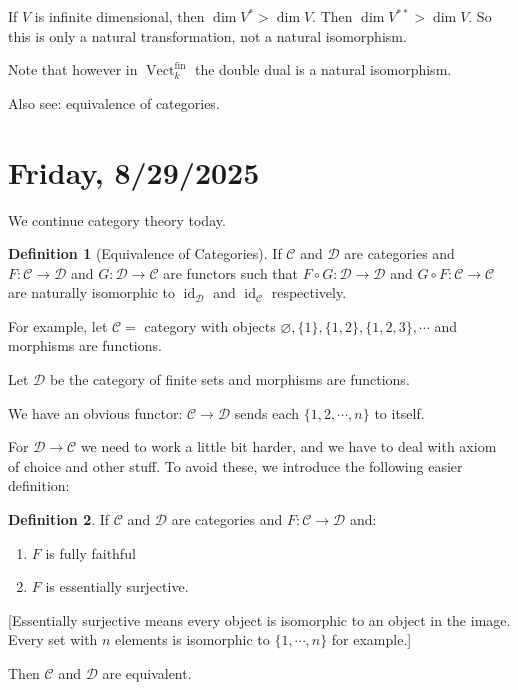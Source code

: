 \documentclass{article}
\theoremstyle{definition}
\newtheorem*{definition}{Definition}
\begin{document}
    If \(V\) is infinite dimensional, then \(\dim V^{\ast} > \dim V\). Then \(\dim V^{\ast\ast} > \dim V\). So this is only a natural transformation, not a natural isomorphism.

    Note that however in \(\operatorname{Vect}_k^{\text{fin}}\) the double dual is a natural isomorphism.

    Also see: equivalence of categories.

    \section*{Friday, 8/29/2025}
    
    We continue category theory today.

    \begin{definition}
        [Equivalence of Categories] If \(\mathcal{C}\) and \(\mathcal{D}\) are categories and \(F: \mathcal{C} \to \mathcal{D}\) and \(G: \mathcal{D} \to \mathcal{C}\) are functors such that \(F \circ G : \mathcal{D} \to \mathcal{D}\) and \(G \circ F: \mathcal{C} \to \mathcal{C}\) are naturally isomorphic to \(\operatorname{id}_{\mathcal{D}} \) and \(\operatorname{id}_{\mathcal{C}} \) respectively.
    \end{definition}

    For example, let \(\mathcal{C} =\) category with objects \(\varnothing , \{ 1 \} , \{ 1,2 \}, \{ 1,2,3 \}, \cdots\) and morphisms are functions.

    Let \(\mathcal{D}\) be the category of finite sets and morphisms are functions.

    We have an obvious functor: \(\mathcal{C} \to \mathcal{D}\) sends each \(\{ 1, 2, \cdots , n \} \) to itself.

    For \(\mathcal{D} \to \mathcal{C}\) we need to work a little bit harder, and we have to deal with axiom of choice and other stuff. To avoid these, we introduce the following easier definition:

    \begin{definition}
        If \(\mathcal{C}\) and \(\mathcal{D}\) are categories and \(F: \mathcal{C} \to \mathcal{D}\) and:

        \begin{enumerate}[label=\arabic*)]
            \item \(F\) is fully faithful
            \item \(F\) is essentially surjective. 
        \end{enumerate} 

        [Essentially surjective means every object is isomorphic to an object in the image. Every set with \(n\) elements is isomorphic to \(\{ 1,\cdots ,n \}\) for example.]

        Then \(\mathcal{C}\) and \(\mathcal{D}\) are equivalent.
    \end{definition}
\end{document}
